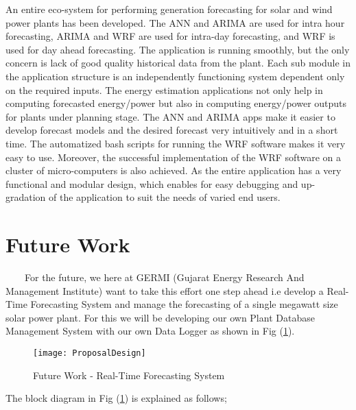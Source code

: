 An entire eco-system for performing generation forecasting for solar and wind power plants has been developed. The ANN and ARIMA are used for intra hour forecasting, ARIMA and WRF are used for intra-day forecasting, and WRF is used for day ahead forecasting. The application is running smoothly, but the only concern is lack of good quality historical data from the plant. Each sub module in the application structure is an independently functioning system dependent only on the required inputs. The energy estimation applications not only help in computing forecasted energy/power but also in computing energy/power outputs for plants under planning stage. The ANN and ARIMA apps make it easier to develop forecast models and the desired forecast very intuitively and in a short time. The automatized bash scripts for running the WRF software makes it very easy to use. Moreover, the successful implementation of the WRF software on a cluster of micro-computers is also achieved. As the entire application has a very functional and modular design, which enables for easy debugging and up-gradation of the application to suit the needs of varied end users.\\

\newpage

\section{Future Work}
\
\
\
\
For the future, we here at GERMI (Gujarat Energy Research And Management Institute) want to take this effort one step ahead i.e develop a Real-Time Forecasting System and manage the forecasting of a single megawatt size solar power plant. For this we will be developing our own Plant Database Management System with our own Data Logger as shown in Fig (\ref{figc10h1}).

\begin{figure}[H]
\centering
\texttt{[image: ProposalDesign]}
\caption{Future Work - Real-Time Forecasting System}
\label{figc10h1} %
\end{figure}

The block diagram in Fig (\ref{figc10h1}) is explained as follows;\\

